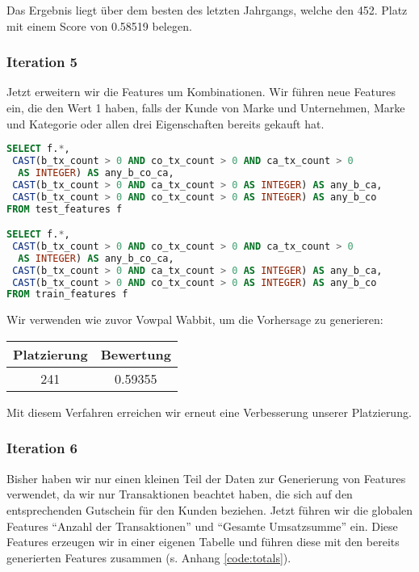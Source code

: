 Das Ergebnis liegt über dem besten des letzten Jahrgangs, welche den 452. Platz mit einem Score von 0.58519 belegen.

\subsubsection{Iteration 5}

Jetzt erweitern wir die Features um Kombinationen. Wir führen neue Features ein, die den Wert 1 haben,
falls der Kunde von Marke und Unternehmen, Marke und Kategorie oder allen drei Eigenschaften bereits
gekauft hat.

\begin{lstlisting}[language=SQL]
SELECT f.*, 
 CAST(b_tx_count > 0 AND co_tx_count > 0 AND ca_tx_count > 0 
  AS INTEGER) AS any_b_co_ca,
 CAST(b_tx_count > 0 AND ca_tx_count > 0 AS INTEGER) AS any_b_ca,
 CAST(b_tx_count > 0 AND co_tx_count > 0 AS INTEGER) AS any_b_co
FROM test_features f

SELECT f.*, 
 CAST(b_tx_count > 0 AND co_tx_count > 0 AND ca_tx_count > 0 
  AS INTEGER) AS any_b_co_ca,
 CAST(b_tx_count > 0 AND ca_tx_count > 0 AS INTEGER) AS any_b_ca,
 CAST(b_tx_count > 0 AND co_tx_count > 0 AS INTEGER) AS any_b_co
FROM train_features f
\end{lstlisting}

Wir verwenden wie zuvor Vowpal Wabbit, um die Vorhersage zu generieren:

\begin{tabular}{|c|c|}
	\hline \textbf{Platzierung} & \textbf{Bewertung} \\ 
	\hline 241 & 0.59355  \\ 
	\hline 
\end{tabular}

Mit diesem Verfahren erreichen wir erneut eine Verbesserung unserer Platzierung.

\subsubsection{Iteration 6}
Bisher haben wir nur einen kleinen Teil der Daten zur Generierung von Features verwendet,
da wir nur Transaktionen beachtet haben, die sich auf den entsprechenden Gutschein für 
den Kunden beziehen. 
Jetzt führen wir die globalen Features "`Anzahl der Transaktionen"' und "`Gesamte Umsatzsumme"' ein. Diese Features erzeugen wir in einer eigenen Tabelle und führen diese mit den bereits generierten Features zusammen (s. Anhang \ref{code:totals}).

